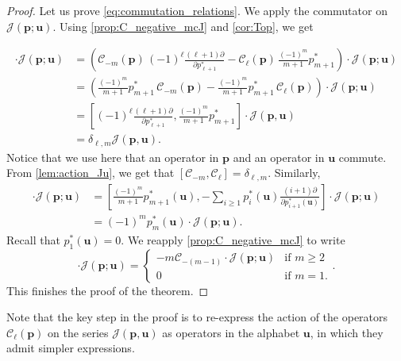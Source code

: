 \documentclass[12pt]{amsart}
\theoremstyle{remark}
\newcommand{\bfp}{\boldsymbol{p}}
\newcommand{\bfu}{\boldsymbol{u}}
\newcommand{\C}{\mathcal C}
\newcommand{\mcJ}{\mathcal{J}}
\begin{document}
\begin{proof}
Let us prove \cref{eq:commutation_relations}. We apply the commutator on $\mcJ(\bfp;\bfu)$. 
Using \cref{prop:C_negative_mcJ} and \cref{cor:Top}, we get

\begin{align*}
  [\C_{-m}(\bfp),\C_\ell(\bfp)]\cdot \mcJ(\bfp;\bfu)
  &=\left(\C_{-m}(\bfp)\,(-1)^\ell\frac{(\ell+1)\partial}{\partial p^*_{\ell+1}} -\C_\ell(\bfp)\,\frac{(-1)^m}{m+1}p^*_{m+1}\right)\cdot \mcJ(\bfp;\bfu)\\
  &=\left(\frac{(-1)^m}{m+1}p^*_{m+1}\,\C_{-m}(\bfp) -\frac{(-1)^m}{m+1}p^*_{m+1}\,\C_\ell(\bfp)\right)\cdot \mcJ(\bfp;\bfu)\\
  &=\left[(-1)^\ell\frac{(\ell+1)\partial}{\partial p^*_{\ell+1}} ,\frac{(-1)^m}{m+1}p^*_{m+1}\right]\cdot \mcJ(\bfp,\bfu)\\
  &=\delta_{\ell,m}\mcJ(\bfp,\bfu).  
\end{align*}
Notice that we use here that an operator in $\bfp$ and an operator in $\bfu$ commute. From \cref{lem:action_Ju}, we get that $[\C_{-m},\C_\ell]=\delta_{\ell,m}.$ Similarly,
\begin{align*}
        [\C_0(\bfp),\C_{-m}(\bfp)]\cdot \mcJ(\bfp;\bfu)
        &=\left[\frac{(-1)^m}{m+1}p^*_{m+1}(\bfu),-\sum_{i\geq 1}p_i^*(\bfu)\frac{(i+1)\partial}{\partial p^*_{i+1}(\bfu)}\right]\cdot \mcJ(\bfp;\bfu)\\
        &=(-1)^mp^*_{m}(\bfu)\cdot \mcJ(\bfp;\bfu).
\end{align*}
Recall that $p^*_1(\bfu)=0$. We reapply \cref{prop:C_negative_mcJ} to write
\begin{equation*}
    [\C_0(\bfp),\C_{-m}(\bfp)]\cdot \mcJ(\bfp;\bfu)=
    \begin{cases}
        -m\C_{-(m-1)}\cdot \mcJ(\bfp;\bfu)&\text{if }m\geq 2\\
        0&\text{if }m=1.
    \end{cases}.
\end{equation*}
This finishes the proof of the theorem.
\end{proof}
Note that the key step in the proof is to re-express the action of the operators $\C_\ell(\bfp)$ on the series $\mcJ(\bfp,\bfu)$ as operators in the alphabet $\bfu$, in which they admit simpler expressions.
\end{document}
